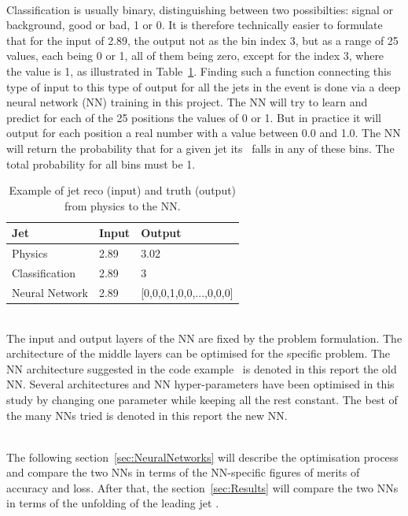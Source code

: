 \ \\Classification is usually binary, distinguishing between two possibilties: signal or background, good or bad, 1 or 0. It is therefore technically easier to formulate that for the input of 2.89, the output not as the bin index 3, but as a range of 25 values, each being 0 or 1, all of them being zero, except for the index 3, where the value is 1, as illustrated in Table~\ref{tab:InputOutput}. Finding such a function connecting this type of input to this type of output for all the jets in the event is done via a deep neural network (NN) training in this project. The NN will try to learn and predict for each of the 25 positions the values of 0 or 1. But in practice it will output for each position a real number with a value between 0.0 and 1.0. The NN will return the probability that for a given jet its \pt~falls in any of these bins. The total probability for all bins must be 1.

\begin{table}[h!]
  \centering
    \begin{tabular}{|l|l|l|}
      \hline
      \textbf{Jet} & \textbf{Input} & \textbf{Output}\\
      \hline
      Physics & 2.89 & 3.02 \\
      Classification & 2.89 & 3 \\
      Neural Network & 2.89 & [0,0,0,1,0,0,...,0,0,0] \\
      \hline
    \end{tabular}
 \caption {Example of jet reco (input) and truth (output) from physics to the NN.}
\label{tab:InputOutput}
\end{table}

\ \\The input and output layers of the NN are fixed by the problem formulation. The architecture of the middle layers can be optimised for the specific problem. The NN architecture suggested in the code example~\cite{AGlazovCode} is denoted in this report the old NN. Several architectures and NN hyper-parameters have been optimised in this study by changing one parameter while keeping all the rest constant. The best of the many NNs tried is denoted in this report the new NN. 

\ \\The following section~\ref{sec:NeuralNetworks} will describe the optimisation process and compare the two NNs in terms of the NN-specific figures of merits of accuracy and loss. After that, the section~\ref{sec:Results} will compare the two NNs in terms of the unfolding of the leading jet \pt.
